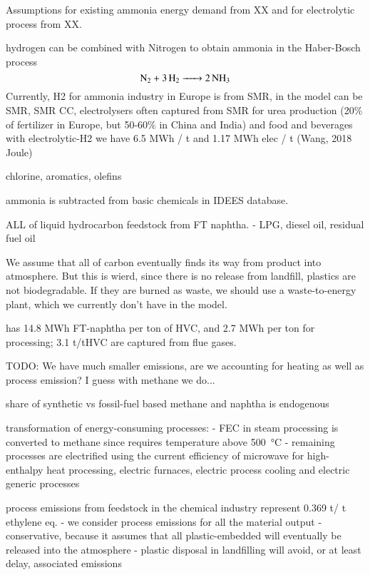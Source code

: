 Assumptions for existing ammonia energy demand from XX and for electrolytic
process from XX.

hydrogen can be combined with Nitrogen to obtain ammonia in the Haber-Bosch process 
\begin{equation}
    \ce{N2 + 3H2 -> 2NH3}
\end{equation}
Currently, H2 for ammonia industry in Europe is from SMR, in the model can be SMR, SMR CC, electrolysers
\co often captured from SMR for urea production (20\% of fertilizer in Europe,
but 50-60\% in China and India) and food and beverages
with electrolytic-H2 we have 6.5 MWh  / t  and 1.17 MWh elec / t  (Wang, 2018 Joule)

chlorine, aromatics, olefins

ammonia is subtracted from basic chemicals in IDEES database.


ALL of liquid hydrocarbon feedstock from FT naphtha.
- LPG, diesel oil, residual fuel oil

We assume that all of carbon eventually finds its way from product into
atmosphere. But this is wierd, since there is no release from landfill, plastics
are not biodegradable. If they are burned as waste, we should use a
waste-to-energy plant, which we currently don't have in the model.

 has 14.8 MWh FT-naphtha per ton of HVC, and 2.7 MWh per
ton for processing; 3.1 t\co/tHVC are captured from flue gases.

TODO: We have much smaller emissions, are we accounting for heating as well as
process emission? I guess with methane we do...

share of synthetic vs fossil-fuel based methane and naphtha is endogenous

transformation of energy-consuming processes:
- FEC in steam processing is converted to methane since requires temperature above \SI{500}{\celsius} 
- remaining processes are electrified using the current efficiency  of microwave for high-enthalpy heat processing,
  electric furnaces, electric process cooling and electric generic processes

process emissions from feedstock in the chemical industry represent 0.369 t\co / t ethylene eq.
- we consider process emissions for all the material output
- conservative, because it assumes that all plastic-embedded \co will eventually be released into the atmosphere
- plastic disposal in landfilling will avoid, or at least delay, associated \co emissions

